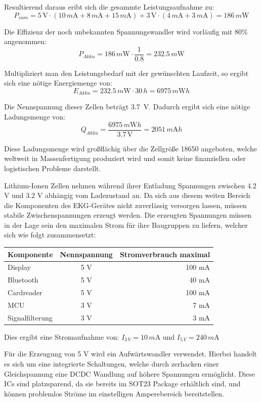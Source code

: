 Resultierend daraus eribt sich die gesammte Leistungsaufnahme zu: 
\[ P_{sum} = 5\,\mbox{V} \cdot (10\,m \mbox{A} + 8\,m\mbox{A} + 15\,m\mbox{A}) + 3\,\mbox{V} \cdot (4\, m\mbox{A} + 3 \,m\mbox{A}) = 186\, m\mbox{W} \]

Die Effizienz der noch unbekannten Spannungswandler wird vorläufig mit 80\% angenommen:
$$ P_{Akku} = 186\,m\mbox{W} \cdot \frac{1}{0.8} = 232.5\,m\mbox{W} $$

Multipliziert man den Leistungsbedarf mit der gewünschten Laufzeit, so ergibt sich eine nötige Energiemenge von:
$$ E_{Akku} = 232.5\,m\mbox{W} \cdot 30\,h = 6975\,m\mbox{W}h $$

Die Nennspannung dieser Zellen beträgt \SI{3,7}{\volt}. Dadurch ergibt sich eine nötige Ladungsmenge von: 
$$ Q_{Akku} = \frac{6975\,m \mbox{W} h}{3.7\,\mbox{V}} = 2051\,m\mbox{A}h $$

Diese Ladungsmenge wird großflächig über die Zellgröße 18650 angeboten, welche weltweit in Massenfertigung produziert wird und somit keine finanziellen oder logistischen Probleme darstellt.

Lithium-Ionen Zellen nehmen während ihrer Entladung Spannungen zwischen 4.2 V und 3.2 V abhängig vom Ladezustand an. Da sich aus diesem weiten Bereich die Komponenten des EKG-Gerätes nicht zuverlässig versorgen lassen, müssen stabile Zwischenspannungen erzeugt werden. Die erzeugten Spannungen müssen in der Lage sein den maximalen Strom für ihre Baugruppen zu liefern, welcher sich wie folgt zusammensetzt:

\begin{table}
\center
\begin{tabular}[h]{l|c|r}
Komponente & Nennspannung & Stromverbrauch maximal\\
\hline
Display & 5 V & 100 mA \cite{Datenblatt_Nextion}\\
Bluetooth & 5 V & 40 mA \cite{HC-05_Datasheet}\\
Cardreader & 5 V & 100 mA \cite{SD_Karte}\\
MCU & 3 V & 7 mA \cite{Datenblatt_MSP430F5529}\\
Signalfilterung & 3  V & 3 mA \\
\end{tabular}
\end{table}

Dies ergibt eine Stromaufnahme von: $ I_{3\,V} = 10\,m\mbox{A}$ und $I_{5\,V} = 240\,m\mbox{A} $

Für die Erzeugung von 5 V wird ein Aufwärtswandler verwendet. Hierbei handelt es sich um eine integrierte Schaltungen, welche durch zerhacken einer Gleichspannung eine DCDC Wandlung auf höhere Spannungen ermöglicht. Diese ICs sind platzsparend, da sie bereits im SOT23 Package erhältlich sind, und können problemlos Ströme im einstelligen Amperebereich bereitstellen. 

